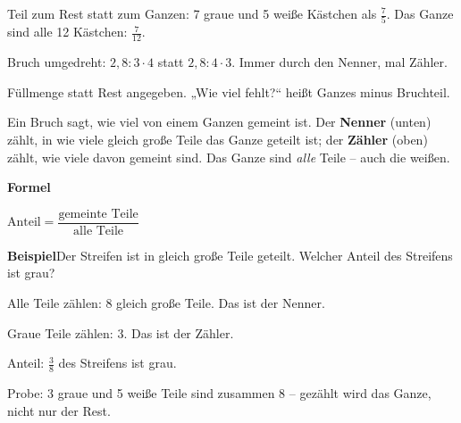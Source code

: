 \documentclass[11pt]{article}
\newcommand{\nr}[1]{\makebox[7mm][l]{\textbf{#1}}}
\begin{document}
\noindent\nr{$\times$}Teil zum Rest statt zum Ganzen: 7 graue und 5 weiße Kästchen als $\frac{7}{5}$. Das Ganze sind alle 12 Kästchen: $\frac{7}{12}$.\par
\noindent\nr{$\times$}Bruch umgedreht: $2{,}8 : 3 \cdot 4$ statt $2{,}8 : 4 \cdot 3$. Immer durch den Nenner, mal Zähler.\par
\noindent\nr{$\times$}Füllmenge statt Rest angegeben. „Wie viel fehlt?“ heißt Ganzes minus Bruchteil.\par
\clearpage\label{s:A}\noindent\colorbox{black!12}{}\hspace{3mm}{\Large\bfseries Anteil ablesen: Zähler und Nenner}\par\smallskip
\noindent Ein Bruch sagt, wie viel von einem Ganzen gemeint ist. Der \textbf{Nenner} (unten) zählt, in wie viele gleich große Teile das Ganze geteilt ist; der \textbf{Zähler} (oben) zählt, wie viele davon gemeint sind. Das Ganze sind \emph{alle} Teile – auch die weißen.\par\medskip
\noindent\textbf{Formel}\par\nopagebreak\noindent\hspace*{4mm}\begin{minipage}{\dimexpr\linewidth-4mm\relax}$\text{Anteil} = \dfrac{\text{gemeinte Teile}}{\text{alle Teile}}$ \end{minipage}\par\medskip
\noindent\textbf{Beispiel}\quad Der Streifen ist in gleich große Teile geteilt. Welcher Anteil des Streifens ist grau?\par\smallskip
\noindent\begin{minipage}[t]{0.6\linewidth}\vspace{0pt}\par\noindent{}Alle Teile zählen: 8 gleich große Teile. Das ist der Nenner.\par\smallskip\par\noindent{}Graue Teile zählen: 3. Das ist der Zähler.\par\smallskip\par\noindent{}Anteil: $\frac{3}{8}$ des Streifens ist grau.\par\smallskip\par\noindent{}Probe: 3 graue und 5 weiße Teile sind zusammen 8 – gezählt wird das Ganze, nicht nur der Rest.\par\smallskip\end{minipage}\hfill
\end{document}
